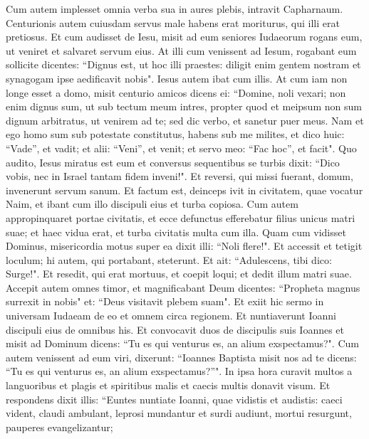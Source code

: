 \begin{biblechapter}  
\verse Cum autem implesset omnia verba sua in aures plebis, intravit Capharnaum. 
\verse Centurionis autem cuiusdam servus male habens erat moriturus, qui illi erat pretiosus. 
\verse Et cum audisset de Iesu, misit ad eum seniores Iudaeorum rogans eum, ut veniret et salvaret servum eius. 
\verse At illi cum venissent ad Iesum, rogabant eum sollicite dicentes: “Dignus est, ut hoc illi praestes: 
\verse diligit enim gentem nostram et synagogam ipse aedificavit nobis". 
\verse Iesus autem ibat cum illis. At cum iam non longe esset a domo, misit centurio amicos dicens ei: “Domine, noli vexari; non enim dignus sum, ut sub tectum meum intres, 
\verse propter quod et meipsum non sum dignum arbitratus, ut venirem ad te; sed dic verbo, et sanetur puer meus. 
\verse Nam et ego homo sum sub potestate constitutus, habens sub me milites, et dico huic: “Vade”, et vadit; et alii: “Veni”, et venit; et servo meo: “Fac hoc”, et facit". 
\verse Quo audito, Iesus miratus est eum et conversus sequentibus se turbis dixit: “Dico vobis, nec in Israel tantam fidem inveni!". 
\verse Et reversi, qui missi fuerant, domum, invenerunt servum sanum. 
\verse Et factum est, deinceps ivit in civitatem, quae vocatur Naim, et ibant cum illo discipuli eius et turba copiosa. 
\verse Cum autem appropinquaret portae civitatis, et ecce defunctus efferebatur filius unicus matri suae; et haec vidua erat, et turba civitatis multa cum illa. 
\verse Quam cum vidisset Dominus, misericordia motus super ea dixit illi: “Noli flere!". 
\verse Et accessit et tetigit loculum; hi autem, qui portabant, steterunt. Et ait: “Adulescens, tibi dico: Surge!". 
\verse Et resedit, qui erat mortuus, et coepit loqui; et dedit illum matri suae. 
\verse Accepit autem omnes timor, et magnificabant Deum dicentes: “Propheta magnus surrexit in nobis" et: “Deus visitavit plebem suam". 
\verse Et exiit hic sermo in universam Iudaeam de eo et omnem circa regionem. 
\verse Et nuntiaverunt Ioanni discipuli eius de omnibus his. 
\verse Et convocavit duos de discipulis suis Ioannes et misit ad Dominum dicens: “Tu es qui venturus es, an alium exspectamus?". 
\verse Cum autem venissent ad eum viri, dixerunt: “Ioannes Baptista misit nos ad te dicens: “Tu es qui venturus es, an alium exspectamus?”". 
\verse In ipsa hora curavit multos a languoribus et plagis et spiritibus malis et caecis multis donavit visum. 
\verse Et respondens dixit illis: “Euntes nuntiate Ioanni, quae vidistis et audistis: caeci vident, claudi ambulant, leprosi mundantur et surdi audiunt, mortui resurgunt, pauperes evangelizantur; 

\end{biblechapter}
